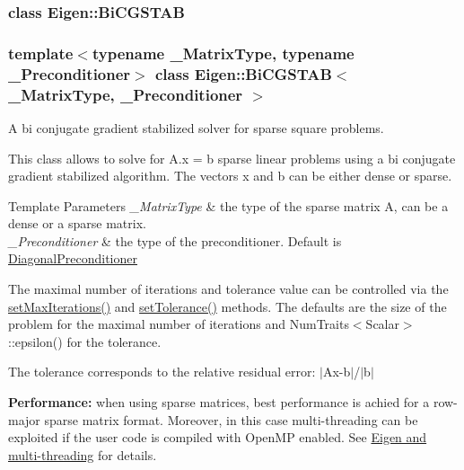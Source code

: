 \label{class_eigen_1_1_bi_c_g_s_t_a_b}
\subsubsection{class Eigen\+:\+:Bi\+C\+G\+S\+T\+AB}
\subsubsection*{template$<$typename \+\_\+\+Matrix\+Type, typename \+\_\+\+Preconditioner$>$\newline
class Eigen\+::\+Bi\+C\+G\+S\+T\+A\+B$<$ \+\_\+\+Matrix\+Type, \+\_\+\+Preconditioner $>$}

A bi conjugate gradient stabilized solver for sparse square problems. 

This class allows to solve for A.\+x = b sparse linear problems using a bi conjugate gradient stabilized algorithm. The vectors x and b can be either dense or sparse.


\begin{DoxyTemplParams}{Template Parameters}
{\em \+\_\+\+Matrix\+Type} & the type of the sparse matrix A, can be a dense or a sparse matrix. \\
\hline
{\em \+\_\+\+Preconditioner} & the type of the preconditioner. Default is \hyperlink{group___iterative_linear_solvers___module_class_eigen_1_1_diagonal_preconditioner}{Diagonal\+Preconditioner}\\
\hline
\end{DoxyTemplParams}


The maximal number of iterations and tolerance value can be controlled via the \hyperlink{group___iterative_linear_solvers___module_af83de7a7d31d9d4bd1fef6222b07335b}{set\+Max\+Iterations()} and \hyperlink{group___iterative_linear_solvers___module_ac160a444af8998f93da9aa30e858470d}{set\+Tolerance()} methods. The defaults are the size of the problem for the maximal number of iterations and Num\+Traits$<$\+Scalar$>$\+::epsilon() for the tolerance.

The tolerance corresponds to the relative residual error\+: $\vert$\+Ax-\/b$\vert$/$\vert$b$\vert$

{\bfseries Performance\+:} when using sparse matrices, best performance is achied for a row-\/major sparse matrix format. Moreover, in this case multi-\/threading can be exploited if the user code is compiled with Open\+MP enabled. See \hyperlink{TopicMultiThreading}{Eigen and multi-\/threading} for details.

